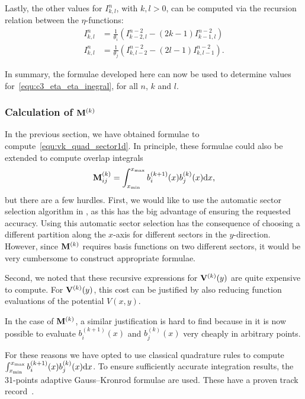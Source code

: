 Lastly, the other values for $I_{k,l}^n$, with $k, l > 0$, can be computed via the recursion relation between the $\eta$-functions:
\begin{align*}
  I_{k, l}^n & = \frac{1}{\theta_i} \left(I_{k-2,l}^{n-2} - (2k - 1) I_{k-1,l}^{n-2}\right)         \\
  I_{k, l}^n & = \frac{1}{\theta_j} \left(I_{k,l-2}^{n-2} - (2l - 1) I_{k,l-1}^{n-2}\right)\text{.}
\end{align*}

In summary, the formulae developed here can now be used to determine values for~\eqref{equ:c3_eta_eta_inegral}, for all $n$, $k$ and $l$.

\subsubsection{Calculation of \texorpdfstring{$\vb{M}^{(k)}$}{M(k)}}

In the previous section, we have obtained formulae to compute~\eqref{equ:vk_quad_sector1d}. In principle, these formulae could also be extended to compute overlap integrals
$$
  \vb{M}_{ij}^{(k)} = \int_{{x_{\text{min}}}}^{{x_{\text{max}}}}b_i^{(k+1)}(x)b_j^{(k)}(x)\dd x\text{,}
$$
but there are a few hurdles. First, we would like to use the automatic sector selection algorithm in \matslise{}, as this has the big advantage of ensuring the requested accuracy. Using this automatic sector selection has the consequence of choosing a different partition along the $x$-axis for different sectors in the $y$-direction. However, since $\vb{M}^{(k)}$ requires basis functions on two different sectors, it would be very cumbersome to construct appropriate formulae.

Second, we noted that these recursive expressions for $\vb{V}^{(k)}(y)$ are quite expensive to compute. For $\vb{V}^{(k)}(y)$, this cost can be justified by also reducing function evaluations of the potential $V(x, y)$.

In the case of $\vb{M}^{(k)}$, a similar justification is hard to find because in  it is now possible to evaluate $b^{(k+1)}_i(x)$ and $b^{(k)}_j(x)$ very cheaply in arbitrary points.

For these reasons we have opted to use classical quadrature rules to compute $\int_{{x_{\text{min}}}}^{{x_{\text{max}}}}b_i^{(k+1)}(x)b_j^{(k)}(x)\dd x$. To ensure sufficiently accurate integration results, the 31-points adaptive Gauss--Kronrod formulae are used. These have a proven track record~\cite{piessens_quadpack_1983}.



